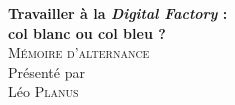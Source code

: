 \begin{titlepage}

\centering

\vspace{2cm}

{\Huge\bfseries Travailler à la \textit{Digital Factory} : \\col blanc ou col bleu ?}\\[0.5cm]

{\large\textsc{Mémoire d'alternance}}\\[2cm]

{\large Présenté par}\\[0.5cm]
{\Huge Léo \textsc{Planus}}\\[1.5cm]


\end{titlepage}
